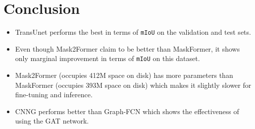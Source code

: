 \section{Conclusion}
\begin{itemize}
    \item TransUnet performs the best in terms of \texttt{mIoU} on the validation and test sets.
    \item Even though Mask2Former claim to be better than MaskFormer, it shows only marginal improvement in terms of \texttt{mIoU} on this dataset.
    \item Mask2Former (occupies 412M space on disk) has more parameters than MaskFormer (occupies 393M space on disk) which makes it slightly slower for fine-tuning and inference.
    \item CNNG performs better than Graph-FCN which shows the effectiveness of using the GAT network.
\end{itemize}